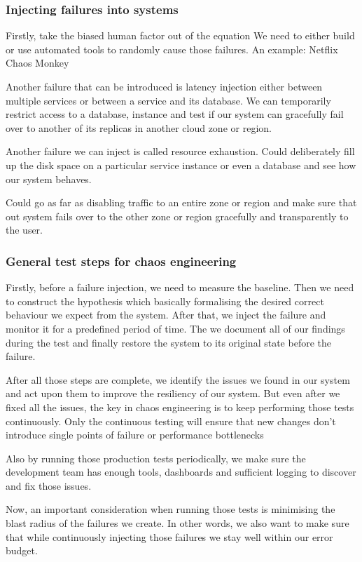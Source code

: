 \subsubsection{Injecting failures into systems}
Firstly, take the biased human factor out of the equation
We need to either build or use automated tools to randomly cause those failures.
An example: Netflix Chaos Monkey

Another failure that can be introduced is latency injection either between multiple services or between a service and its database.
We can temporarily restrict access to a database, instance and test if our system can gracefully fail over to another of its replicas in another cloud zone or region.

Another failure we can inject is called resource exhaustion.
Could deliberately fill up the disk space on a particular service instance or even a database and see how our system behaves.

Could go as far as disabling traffic to an entire zone or region and make sure that out system fails over to the other zone or region gracefully and transparently to the user.

\subsubsection{General test steps for chaos engineering}
Firstly, before a failure injection, we need to measure the baseline.
Then we need to construct the hypothesis which basically formalising the desired correct behaviour we expect from the system.
After that, we inject the failure and monitor it for a predefined period of time.
The we document all of our findings during the test and finally restore the system to its original state before the failure.

After all those steps are complete, we identify the issues we found in our system and act upon them to improve the resiliency of our system.
But even after we fixed all the issues, the key in chaos engineering is to keep performing those tests continuously.
Only the continuous testing will ensure that new changes don't introduce single points of failure or performance bottlenecks

Also by running those production tests periodically, we make sure the development team has enough tools, dashboards and sufficient logging to discover and fix those issues.

Now, an important consideration when running those tests is minimising the blast radius of the failures we create.
In other words, we also want to make sure that while continuously injecting those failures we stay well within our error budget.

